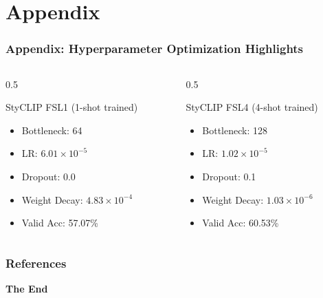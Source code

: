 \documentclass[aspectratio=169,xcolor=dvipsnames]{beamer}
\begin{document}
\section{Appendix}

\begin{frame}
  \frametitle{Appendix: Hyperparameter Optimization Highlights}
  \begin{columns}[T] %
    \begin{column}{0.5\textwidth}
      \begin{block}{StyCLIP FSL1 (1-shot trained)}
        \begin{itemize}
          \item Bottleneck: 64
          \item LR: $6.01 \times 10^{-5}$
          \item Dropout: 0.0
          \item Weight Decay: $4.83 \times 10^{-4}$
          \item Valid Acc: 57.07\%
        \end{itemize}
      \end{block}
    \end{column}
    \begin{column}{0.5\textwidth}
      \begin{block}{StyCLIP FSL4 (4-shot trained)}
        \begin{itemize}
          \item Bottleneck: 128
          \item LR: $1.02 \times 10^{-5}$
          \item Dropout: 0.1
          \item Weight Decay: $1.03 \times 10^{-6}$
          \item Valid Acc: 60.53\%
        \end{itemize}
      \end{block}
    \end{column}
  \end{columns}
\end{frame}


\begin{frame}[allowframebreaks]
    \frametitle{References}
    \footnotesize %
    
\end{frame}

\begin{frame}
    \Huge{\centerline{\textbf{The End}}}
\end{frame}
\end{document}
